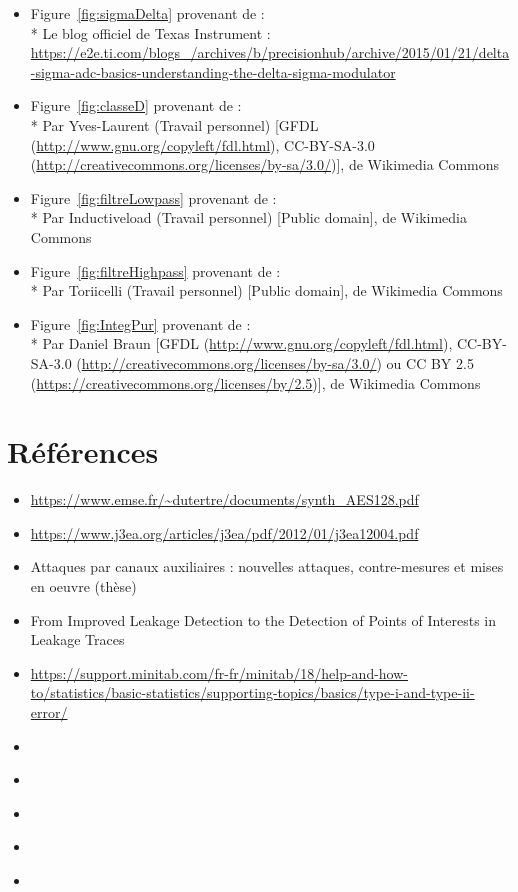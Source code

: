 \documentclass[10pt, oneside, a4paper]{article}
\begin{document}
\begin{itemize}
\item Figure~\ref{fig:sigmaDelta} provenant de :\\*
Le blog officiel de Texas Instrument :
\url{https://e2e.ti.com/blogs_/archives/b/precisionhub/archive/2015/01/21/delta-sigma-adc-basics-understanding-the-delta-sigma-modulator}

\item Figure~\ref{fig:classeD} provenant de :\\*
Par Yves-Laurent (Travail personnel) [GFDL (\url{http://www.gnu.org/copyleft/fdl.html}),
CC-BY-SA-3.0 (\url{http://creativecommons.org/licenses/by-sa/3.0/})], de Wikimedia Commons

\item Figure~\ref{fig:filtreLowpass} provenant de :\\*
Par Inductiveload (Travail personnel) [Public domain], de Wikimedia Commons

\item Figure~\ref{fig:filtreHighpass} provenant de :\\*
Par Toriicelli (Travail personnel) [Public domain], de Wikimedia Commons

\item Figure~\ref{fig:IntegPur} provenant de :\\*
Par Daniel Braun [GFDL (\url{http://www.gnu.org/copyleft/fdl.html}),
CC-BY-SA-3.0 (\url{http://creativecommons.org/licenses/by-sa/3.0/}) ou
CC BY 2.5 (\url{https://creativecommons.org/licenses/by/2.5})], de Wikimedia Commons
\end{itemize}

\section*{Références}

\begin{itemize}
\item \url{https://www.emse.fr/~dutertre/documents/synth_AES128.pdf}
\item \url{https://www.j3ea.org/articles/j3ea/pdf/2012/01/j3ea12004.pdf}
\item Attaques par canaux auxiliaires : nouvelles attaques, contre-mesures et mises en oeuvre (thèse)
\item From Improved Leakage Detection to the Detection of Points of Interests in Leakage Traces
\item \url{https://support.minitab.com/fr-fr/minitab/18/help-and-how-to/statistics/basic-statistics/supporting-topics/basics/type-i-and-type-ii-error/}
\item \url{}
\item \url{}
\item \url{}
\item \url{}
\item \url{}
\end{itemize}
\end{document}
